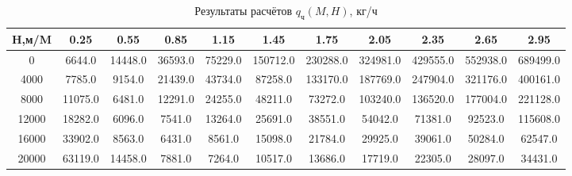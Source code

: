 \begin{table}[H]
\centering
\caption{Результаты расчётов $q_\text{ч}(M,H)$, кг/ч}
\label{nx}
\begin{tabular}{|c|c|c|c|c|c|c|c|c|c|c|}
\toprule
H,м/M &     0.25 &     0.55 &     0.85 &     1.15 &      1.45 &      1.75 &      2.05 &      2.35 &      2.65 &      2.95 \\
\midrule
0     &   6644.0 &  14448.0 &  36593.0 &  75229.0 &  150712.0 &  230288.0 &  324981.0 &  429555.0 &  552938.0 &  689499.0 \\
4000  &   7785.0 &   9154.0 &  21439.0 &  43734.0 &   87258.0 &  133170.0 &  187769.0 &  247904.0 &  321176.0 &  400161.0 \\
8000  &  11075.0 &   6481.0 &  12291.0 &  24255.0 &   48211.0 &   73272.0 &  103240.0 &  136520.0 &  177004.0 &  221128.0 \\
12000 &  18282.0 &   6096.0 &   7541.0 &  13264.0 &   25691.0 &   38551.0 &   54042.0 &   71381.0 &   92523.0 &  115608.0 \\
16000 &  33902.0 &   8563.0 &   6431.0 &   8561.0 &   15098.0 &   21784.0 &   29925.0 &   39061.0 &   50284.0 &   62547.0 \\
20000 &  63119.0 &  14458.0 &   7881.0 &   7264.0 &   10517.0 &   13686.0 &   17719.0 &   22305.0 &   28097.0 &   34431.0 \\
\bottomrule
\end{tabular}
\end{table}
